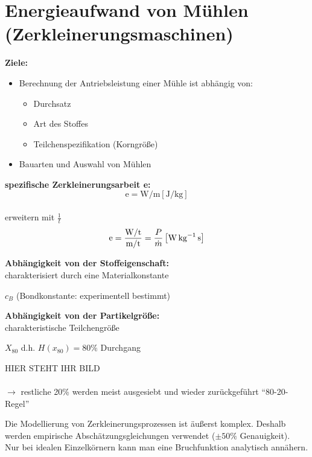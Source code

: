 \newpage

\section{Energieaufwand von Mühlen (Zerkleinerungsmaschinen)}
\textbf{\large{Ziele:}}
\begin{itemize}
	\item Berechnung der Antriebsleistung einer Mühle ist abhängig von:
	\begin{itemize}
		\item Durchsatz
		\item Art des Stoffes
		\item Teilchenspezifikation (Korngröße)
	\end{itemize}
	\item Bauarten und Auswahl von Mühlen
\end{itemize}

\textbf{\large{spezifische Zerkleinerungsarbeit e:}}\\
\begin{equation}
	\text{e}=\si{\watt \per \meter} \left[\si{\joule \per \kilogram}\right]
\end{equation}\\
erweitern mit $\frac{1}{t}$
\begin{equation}
	\text{e}=\frac{\si{\watt\per t}}{\si{\meter \per t}}= \frac{P}{\dot{m}} \left[\si{\watt\per\kg\per \raiseto{-1}\second}\right]
\end{equation}

\textbf{Abhängigkeit von der Stoffeigenschaft:}\\
charakterisiert durch eine Materialkonstante
\begin{center}
	$c_B$ (Bondkonstante: experimentell bestimmt)
\end{center}

\textbf{Abhängigkeit von der Partikelgröße:}\\
charakteristische Teilchengröße
\begin{center}
	$X_{80} $ d.h. $H(x_{80})=80\%$ Durchgang
\end{center}

HIER STEHT IHR BILD\\ \\

$\rightarrow$ restliche 20\% werden meist ausgesiebt und wieder zurückgeführt "`80-20-Regel"'\\

\newpage

Die Modellierung von Zerkleinerungsprozessen ist äußerst komplex. Deshalb werden empirische Abschätzungsgleichungen verwendet ($\pm 50\%$ Genauigkeit).\\
Nur bei idealen Einzelkörnern kann man eine Bruchfunktion analytisch annähern.


